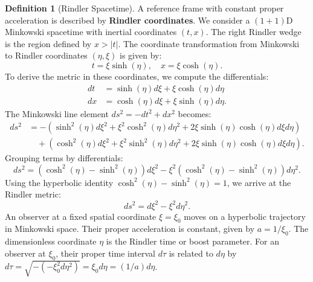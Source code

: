 \documentclass[11pt, letterpaper]{report}
\theoremstyle{plain} %
\theoremstyle{definition} %
\newtheorem{definition}{Definition}[chapter]
\theoremstyle{remark} %
\begin{document}
\begin{definition}[Rindler Spacetime]
\label{def:rindler_spacetime}
A reference frame with constant proper acceleration is described by \textbf{Rindler coordinates}. We consider a $(1+1)$D Minkowski spacetime with inertial coordinates $(t,x)$. The right Rindler wedge is the region defined by $x > |t|$. The coordinate transformation from Minkowski to Rindler coordinates $(\eta, \xi)$ is given by:
\begin{equation}
    t = \xi \sinh(\eta), \quad x = \xi \cosh(\eta).
    \label{eq:minkowski_to_rindler}
\end{equation}
To derive the metric in these coordinates, we compute the differentials:
\begin{align}
    dt &= \sinh(\eta)d\xi + \xi\cosh(\eta)d\eta \\
    dx &= \cosh(\eta)d\xi + \xi\sinh(\eta)d\eta.
\end{align}
The Minkowski line element $ds^2 = -dt^2 + dx^2$ becomes:
\begin{align}
    ds^2 &= -(\sinh^2(\eta)d\xi^2 + \xi^2\cosh^2(\eta)d\eta^2 + 2\xi\sinh(\eta)\cosh(\eta)d\xi d\eta) \nonumber \\
         &\quad + (\cosh^2(\eta)d\xi^2 + \xi^2\sinh^2(\eta)d\eta^2 + 2\xi\sinh(\eta)\cosh(\eta)d\xi d\eta).
\end{align}
Grouping terms by differentials:
\begin{equation}
    ds^2 = (\cosh^2(\eta) - \sinh^2(\eta))d\xi^2 - \xi^2(\cosh^2(\eta) - \sinh^2(\eta))d\eta^2.
\end{equation}
Using the hyperbolic identity $\cosh^2(\eta) - \sinh^2(\eta) = 1$, we arrive at the Rindler metric:
\begin{equation}
    ds^2 = d\xi^2 - \xi^2 d\eta^2.
    \label{eq:rindler_metric_final}
\end{equation}
An observer at a fixed spatial coordinate $\xi = \xi_0$ moves on a hyperbolic trajectory in Minkowski space. Their proper acceleration is constant, given by $a = 1/\xi_0$. The dimensionless coordinate $\eta$ is the Rindler time or boost parameter. For an observer at $\xi_0$, their proper time interval $d\tau$ is related to $d\eta$ by $d\tau = \sqrt{-\left(-\xi_0^2 d\eta^2\right)} = \xi_0 d\eta = (1/a) d\eta$.
\end{definition}
\end{document}
